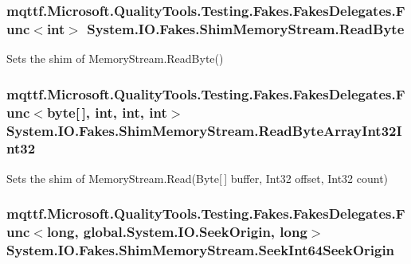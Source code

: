 \hypertarget{class_system_1_1_i_o_1_1_fakes_1_1_shim_memory_stream_aa0f547f9ec94732c81a214c9e177e1f7}{
\subsubsection[{Read\-Byte}]{\setlength{\rightskip}{0pt plus 5cm}mqttf.\-Microsoft.\-Quality\-Tools.\-Testing.\-Fakes.\-Fakes\-Delegates.\-Func$<$int$>$ System.\-I\-O.\-Fakes.\-Shim\-Memory\-Stream.\-Read\-Byte\hspace{0.3cm}{\ttfamily [set]}}}\label{class_system_1_1_i_o_1_1_fakes_1_1_shim_memory_stream_aa0f547f9ec94732c81a214c9e177e1f7}


Sets the shim of Memory\-Stream.\-Read\-Byte()

\hypertarget{class_system_1_1_i_o_1_1_fakes_1_1_shim_memory_stream_aae81394963bb037022edf0a5f3fc40a6}{
\subsubsection[{Read\-Byte\-Array\-Int32\-Int32}]{\setlength{\rightskip}{0pt plus 5cm}mqttf.\-Microsoft.\-Quality\-Tools.\-Testing.\-Fakes.\-Fakes\-Delegates.\-Func$<$byte\mbox{[}$\,$\mbox{]}, int, int, int$>$ System.\-I\-O.\-Fakes.\-Shim\-Memory\-Stream.\-Read\-Byte\-Array\-Int32\-Int32\hspace{0.3cm}{\ttfamily [set]}}}\label{class_system_1_1_i_o_1_1_fakes_1_1_shim_memory_stream_aae81394963bb037022edf0a5f3fc40a6}


Sets the shim of Memory\-Stream.\-Read(\-Byte\mbox{[}$\,$\mbox{]} buffer, Int32 offset, Int32 count)

\hypertarget{class_system_1_1_i_o_1_1_fakes_1_1_shim_memory_stream_a47efbf35de0909277fabae75e6ab13ed}{
\subsubsection[{Seek\-Int64\-Seek\-Origin}]{\setlength{\rightskip}{0pt plus 5cm}mqttf.\-Microsoft.\-Quality\-Tools.\-Testing.\-Fakes.\-Fakes\-Delegates.\-Func$<$long, global.\-System.\-I\-O.\-Seek\-Origin, long$>$ System.\-I\-O.\-Fakes.\-Shim\-Memory\-Stream.\-Seek\-Int64\-Seek\-Origin\hspace{0.3cm}{\ttfamily [set]}}}\label{class_system_1_1_i_o_1_1_fakes_1_1_shim_memory_stream_a47efbf35de0909277fabae75e6ab13ed}


